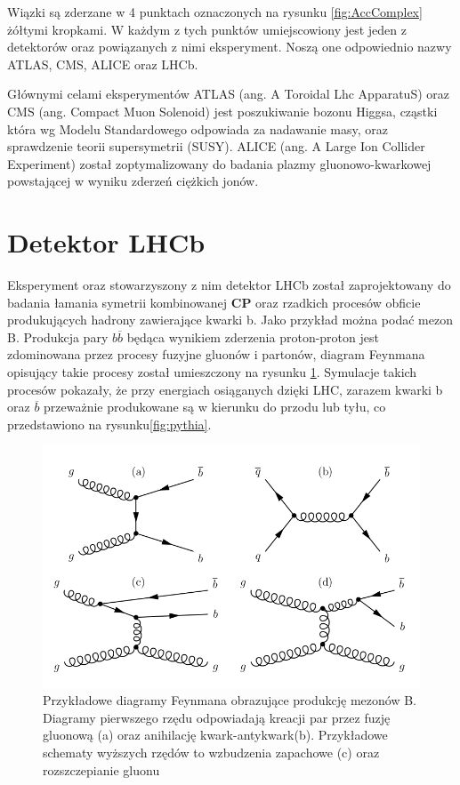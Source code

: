Wiązki są zderzane w 4 punktach oznaczonych na rysunku \ref{fig:AccComplex} żółtymi kropkami. W każdym z tych punktów umiejscowiony jest jeden z detektorów oraz powiązanych z nimi eksperyment. Noszą one odpowiednio nazwy ATLAS, CMS, ALICE oraz LHCb.

Głównymi celami eksperymentów ATLAS (ang. A Toroidal Lhc ApparatuS)\cite{ATLAS} oraz CMS (ang. Compact Muon Solenoid) \cite{CMS} jest poszukiwanie bozonu Higgsa, cząstki która wg Modelu Standardowego odpowiada za nadawanie masy, oraz sprawdzenie teorii supersymetrii (SUSY). ALICE (ang. A Large Ion Collider Experiment)\cite{ALICE} został zoptymalizowany do badania plazmy gluonowo-kwarkowej powstającej w wyniku zderzeń ciężkich jonów.


\section{Detektor LHCb}
Eksperyment oraz stowarzyszony z nim detektor LHCb został zaprojektowany do badania łamania symetrii kombinowanej \textbf{CP} oraz rzadkich procesów obficie produkujących hadrony zawierające kwarki b. Jako przykład można podać mezon B. Produkcja pary $b\overline{b}$ będąca wynikiem zderzenia proton-proton jest zdominowana przez procesy fuzyjne gluonów i partonów, diagram Feynmana opisujący takie procesy został umieszczony na rysunku \ref{fig:feynman}.  Symulacje takich procesów pokazały, że przy energiach osiąganych dzięki LHC, zarazem kwarki b oraz $\overline{b}$ przeważnie produkowane są w kierunku do przodu lub tyłu, co przedstawiono na rysunku\ref{fig:pythia}.  


\begin{figure}[h]
  \centering
  \includegraphics[scale=0.5]{rozdzial2/Feynman.png}
  \caption{Przykładowe diagramy Feynmana obrazujące produkcję mezonów B. Diagramy pierwszego rzędu odpowiadają kreacji par przez fuzję gluonową (a) oraz anihilację kwark-antykwark(b). Przykładowe schematy wyższych rzędów to wzbudzenia zapachowe (c) oraz rozszczepianie gluonu}
  \label{fig:feynman}
\end{figure}



